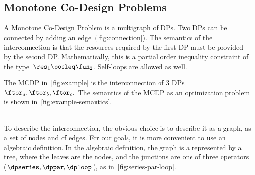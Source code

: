 

\subsection{Monotone Co-Design Problems \label{sec:Monotone-Co-Design-Problems}}

A Monotone Co-Design Problem is a multigraph of DPs. Two DPs can be
connected by adding an edge~(\cref{fig:connection}). The semantics
of the interconnection is that the resources required by the first
DP must be provided by the second DP. Mathematically, this is a partial
order inequality constraint of the type~$\res_{1}\posleq\fun_{2}$.
Self-loops are allowed as well.

\begin{example}
The MCDP in~\cref{fig:example} is the interconnection of 3
DPs $\ftor_{a},\ftor_{b},\ftor_{c}.$ The semantics of the MCDP as
an optimization problem is shown in~\cref{fig:example-semantics}.\\
\\
\end{example}
To describe the interconnection, the obvious choice is to describe
it as a graph, as a set of nodes and of edges. For our goals, it is
more convenient to use an algebraic definition. In the algebraic definition,
the graph is a represented by a tree, where the leaves are the nodes,
and the junctions are one of three operators ($\dpseries,\dppar,\dploop$),
as in~\cref{fig:series-par-loop}.

